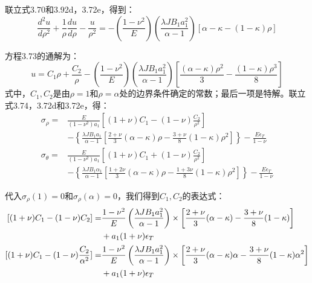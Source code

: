 联立式3.70和3.92d，3.72e，得到：
\begin{equation}
\frac{d^2u}{d\rho^2}+\frac{1}{\rho}\frac{du}{d\rho}-\frac{u}{\rho^2}=-\left(\frac{1-\nu^2}{E}\right)\left(\frac{\lambda JB_1a_1^2}{\alpha-1}\right)[\alpha-\kappa-(1-\kappa)\rho] %
\end{equation}

方程3.73的通解为：
\begin{equation}
u=C_1\rho+\frac{C_2}{\rho}-\left(\frac{1-\nu^2}{E}\right)\left(\frac{\lambda JB_1a_1^2}{\alpha-1}\right)\left[\frac{(\alpha-\kappa)\rho^2}{3}-\frac{(1-\kappa)\rho^3}{8}\right]%
\end{equation}
式中，$C_1,C_2$是由$\rho=1$和$\rho=\alpha$处的边界条件确定的常数；最后一项是特解。联立式3.74，3.72d和3.72e，得：
\begin{subequations}
	\begin{align}
\sigma_\rho=&\frac{E}{(1-\nu^2)a_1}\left[(1+\nu)C_1-(1-\nu)\frac{C_2}{\rho^2}\right] \\ \nonumber
&-\left\{\frac{\lambda JB_1a_1}{\alpha-1}\left[\frac{2+\nu}{3}(\alpha-\kappa)\rho-\frac{3+\nu}{8}(1-\kappa)\rho^2\right]\right\}-\frac{E\epsilon_T}{1-\nu}\\
\sigma_\theta=&\frac{E}{(1-\nu^2)a_1}\left[(1+\nu)C_1+(1-\nu)\frac{C_2}{\rho^2}\right]\\ \nonumber
&-\left\{\frac{\lambda JB_1\alpha_1}{\alpha-1}\left[\frac{1+2\nu}{3}(\alpha-\kappa)\rho-\frac{1+3\nu}{8}(1-\kappa)\rho^2\right]\right\}-\frac{E\epsilon_T}{1-\nu}
	\end{align}
\end{subequations}

代入$\sigma_{\rho}(1)=0$和$\sigma_{\rho}(\alpha)=0$，我们得到$C_1,C_2$的表达式：
\begin{subequations}
	\begin{align}
{[(1+\nu)C_1-(1-\nu)C_2]}=&\frac{1-\nu^2}{E}\left(\frac{\lambda JB_1a_1^2}{\alpha-1}\right)
\times\left[\frac{2+\nu}{3}(\alpha-\kappa)-\frac{3+\nu}{8}(1-\kappa)\right]\notag\\
&+a_1(1+\nu)\epsilon_T\\
{[(1+\nu)C_1-(1-\nu)\frac{C_2}{\alpha^2}]}=&\frac{1-\nu^2}{E}\left(\frac{\lambda JB_1a_1^2}{\alpha-1}\right) \times\left[\frac{2+\nu}{3}(\alpha-\kappa)\alpha-\frac{3+\nu}{8}(1-\kappa)\alpha^2\right]\notag\\
& +a_1(1+\nu)\epsilon_T
	\end{align}
\end{subequations}

